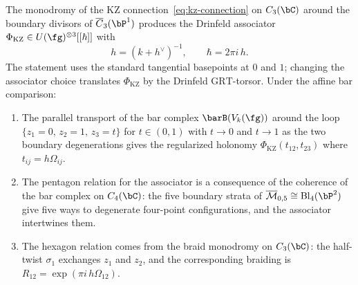 \begin{theorem}
\label{thm:drinfeld-associator-bar}
The monodromy of the KZ connection~\eqref{eq:kz-connection} on $C_3(\bC)$
around the boundary divisors of $\overline{C}_3(\bP^1)$ produces the Drinfeld
associator $\Phi_{\mathrm{KZ}}\in U(\fg)^{\otimes 3}[[\hbar]]$ with
\[
h=(k+h^\vee)^{-1},
\qquad
\hbar=2\pi i\,h .
\]
The statement uses the standard tangential basepoints at $0$ and $1$; changing
the associator choice translates $\Phi_{\mathrm{KZ}}$ by the Drinfeld
$\mathrm{GRT}$-torsor. Under the affine bar comparison:
\begin{enumerate}[label=\textup{(\roman*)}]
\item The parallel transport of the bar complex
 $\barB(V_k(\fg))$ around the loop
 $\{z_1 = 0,\, z_2 = 1,\, z_3 = t\}$ for $t \in (0,1)$
 with $t \to 0$ and $t \to 1$ as the two boundary degenerations
 gives the regularized holonomy
 $\Phi_{\mathrm{KZ}}(t_{12}, t_{23})$
 where $t_{ij}=h\Omega_{ij}$.
\item The pentagon relation for the associator
 is a consequence of the coherence of the bar complex
 on $C_4(\bC)$: the five boundary strata of
 $\overline{\mathcal{M}}_{0,5} \cong \operatorname{Bl}_4(\bP^2)$
 give five ways to degenerate four-point configurations,
 and the associator intertwines them.
\item The hexagon relation comes from the braid monodromy
 on $C_3(\bC)$: the half-twist $\sigma_1$ exchanges
 $z_1$ and $z_2$, and
 the corresponding braiding is
 $R_{12}=\exp(\pi i\,h\Omega_{12})$.
\end{enumerate}
\end{theorem}

